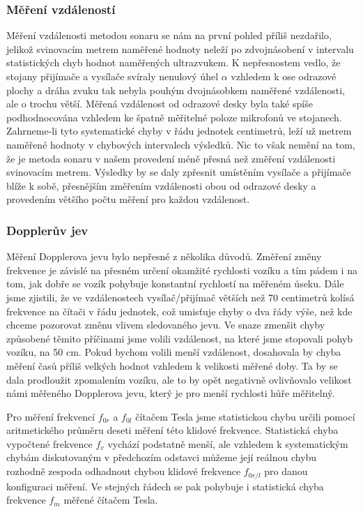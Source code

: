 \documentclass[english]{article}
\begin{document}
	\subsubsection{Měření vzdáleností}
		Měření vzdálenosti metodou sonaru se nám na první pohled příliš nezdařilo, jelikož svinovacím metrem naměřené hodnoty neleží po zdvojnásobení v intervalu statistických chyb hodnot naměřených ultrazvukem. K nepřesnostem vedlo, že stojany přijímače a vysílače svíraly nenulový úhel $\alpha$ vzhledem k ose odrazové plochy a dráha zvuku tak nebyla pouhým dvojnásobkem naměřené vzdálenosti, ale o trochu větší. Měřená vzdálenost od odrazové desky byla také spíše podhodnocována vzhledem ke špatně měřitelné poloze mikrofonů ve stojanech. Zahrneme-li tyto systematické chyby v řádu jednotek centimetrů, leží už metrem naměřené hodnoty v chybových intervalech výsledků. Nic to však nemění na tom, že je metoda sonaru v našem provedení méně přesná než změření vzdálenosti svinovacím metrem. Výsledky by se daly zpřesnit umístěním vysílače a přijímače blíže k sobě, přesnějším změřením vzdálenosti obou od odrazové desky a provedením většího počtu měření pro každou vzdálenost.

	\subsubsection{Dopplerův jev}
		Měření Dopplerova jevu bylo nepřesné z několika důvodů. Změření změny frekvence je závislé na přesném určení okamžité rychlosti vozíku a tím pádem i na tom, jak dobře se vozík pohybuje konstantní rychlostí na měřeném úseku. Dále jsme zjistili, že ve vzdálenostech vysílač/přijímač větších než 70 centimetrů kolísá frekvence na čítači v řádu jednotek, což umisťuje chyby o dva řády výše, než kde chceme pozorovat změnu vlivem sledovaného jevu. Ve snaze zmenšit chyby způsobené těmito příčinami jsme volili vzdálenost, na které jsme stopovali pohyb vozíku, na 50 cm. Pokud bychom volili menší vzdálenost, dosahovala by chyba měření časů příliš velkých hodnot vzhledem k velikosti měřené doby. Ta by se dala prodloužit zpomalením vozíku, ale to by opět negativně ovlivňovalo velikost námi měřeného Dopplerova jevu, který je pro menší rychlosti hůře měřitelný. 
		
		Pro měření frekvencí $f_{0r}$ a $f_{0l}$ čítačem Tesla jsme statistickou chybu určili pomocí aritmetického průměru deseti měření této klidové frekvence. Statistická chyba vypočtené frekvence $f_v$ vychází podstatně menší, ale vzhledem k systematickým chybám diskutovaným v předchozím odstavci můžeme její reálnou chybu rozhodně zespoda odhadnout chybou klidové frekvence $f_{0r/l}$ pro danou konfiguraci měření. Ve stejných řádech se pak pohybuje i statistická chyba frekvence $f_m$ měřené čítačem Tesla.
		
\end{document}
